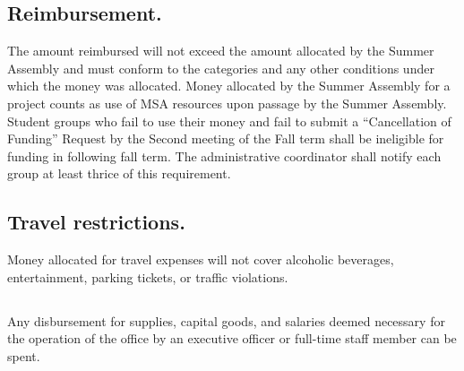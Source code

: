 \subsection{Reimbursement.}
The amount reimbursed will not exceed the amount allocated by the Summer Assembly and must conform to the categories and any other conditions under which the money was allocated. Money allocated by the Summer Assembly for a project counts as use of MSA resources upon passage by the Summer Assembly.  Student groups who fail to use their money and fail to submit a “Cancellation of Funding” Request by the Second meeting of the Fall term shall be ineligible for funding in following fall term.  The administrative coordinator shall notify each group at least thrice of this requirement.

\subsection{Travel restrictions.}
Money allocated for travel expenses will not cover alcoholic beverages, entertainment, parking tickets, or traffic violations.

\subsection{}
Any disbursement for supplies, capital goods, and salaries deemed necessary for the operation of the office by an executive officer or full-time staff member can be spent.
